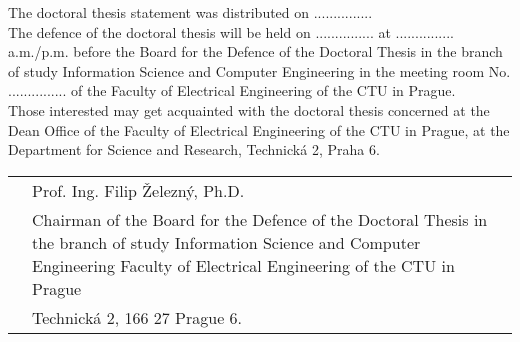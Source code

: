 \noindent
The doctoral thesis statement was distributed on ...............\\

\noindent
The defence of the doctoral thesis will be held on ............... at ............... a.m./p.m. before the Board for the Defence of the Doctoral Thesis in the branch of study Information Science and Computer Engineering in the meeting room No. ............... of the Faculty of Electrical Engineering of the CTU in Prague.\\

\noindent
Those interested may get acquainted with the doctoral thesis concerned at the Dean Office of the Faculty of Electrical Engineering of the CTU in Prague, at the Department for Science and Research, Technická 2, Praha 6.\\[2em]

\noindent
\begin{tabular}{p{6.2cm} p{8.5cm}}%
& Prof. Ing. Filip Železný, Ph.D.\\
& Chairman of the Board for the Defence of the Doctoral Thesis in the branch of study  Information Science and Computer Engineering Faculty of Electrical Engineering of the CTU in Prague\\
& Technická 2, 166 27  Prague 6.
\end{tabular}
